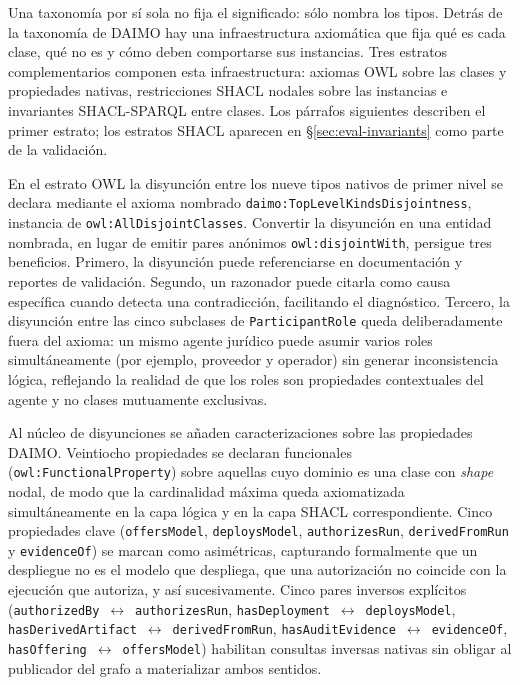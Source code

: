 \documentclass[11pt,a4paper]{article}
\newcommand{\code}[1]{\texttt{#1}}
\begin{document}
Una taxonomía por sí sola no fija el significado: sólo nombra los tipos. Detrás de la taxonomía de DAIMO hay una infraestructura axiomática que fija qué es cada clase, qué no es y cómo deben comportarse sus instancias. Tres estratos complementarios componen esta infraestructura: axiomas OWL sobre las clases y propiedades nativas, restricciones SHACL nodales sobre las instancias e invariantes SHACL-SPARQL entre clases. Los párrafos siguientes describen el primer estrato; los estratos SHACL aparecen en §\ref{sec:eval-invariants} como parte de la validación.

En el estrato OWL la disyunción entre los nueve tipos nativos de primer nivel se declara mediante el axioma nombrado \code{daimo:TopLevelKindsDisjointness}, instancia de \code{owl:AllDisjointClasses}. Convertir la disyunción en una entidad nombrada, en lugar de emitir pares anónimos \code{owl:disjointWith}, persigue tres beneficios. Primero, la disyunción puede referenciarse en documentación y reportes de validación. Segundo, un razonador puede citarla como causa específica cuando detecta una contradicción, facilitando el diagnóstico. Tercero, la disyunción entre las cinco subclases de \code{ParticipantRole} queda deliberadamente fuera del axioma: un mismo agente jurídico puede asumir varios roles simultáneamente (por ejemplo, proveedor y operador) sin generar inconsistencia lógica, reflejando la realidad de que los roles son propiedades contextuales del agente y no clases mutuamente exclusivas.

Al núcleo de disyunciones se añaden caracterizaciones sobre las propiedades DAIMO. Veintiocho propiedades se declaran funcionales (\code{owl:FunctionalProperty}) sobre aquellas cuyo dominio es una clase con \emph{shape} nodal, de modo que la cardinalidad máxima queda axiomatizada simultáneamente en la capa lógica y en la capa SHACL correspondiente. Cinco propiedades clave (\code{offersModel}, \code{deploysModel}, \code{authorizesRun}, \code{derivedFromRun} y \code{evidenceOf}) se marcan como asimétricas, capturando formalmente que un despliegue no es el modelo que despliega, que una autorización no coincide con la ejecución que autoriza, y así sucesivamente. Cinco pares inversos explícitos (\code{authorizedBy}~$\leftrightarrow$~\code{authorizesRun}, \code{hasDeployment}~$\leftrightarrow$~\code{deploysModel}, \code{hasDerivedArtifact}~$\leftrightarrow$~\code{derivedFromRun}, \code{hasAuditEvidence}~$\leftrightarrow$~\code{evidenceOf}, \code{hasOffering}~$\leftrightarrow$~\code{offersModel}) habilitan consultas inversas nativas sin obligar al publicador del grafo a materializar ambos sentidos.
\end{document}
